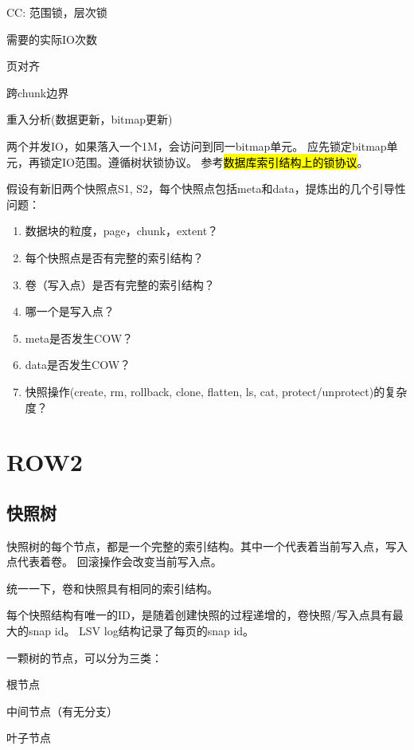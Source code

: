 \begin{itembox}
\item CC: 范围锁，层次锁
\item 需要的实际IO次数
\item 页对齐
\item 跨chunk边界
\item 重入分析(数据更新，bitmap更新)
\end{itembox}

两个并发IO，如果落入一个1M，会访问到同一bitmap单元。
应先锁定bitmap单元，再锁定IO范围。遵循树状锁协议。
参考\hl{数据库索引结构上的锁协议}。

\begin{tcolorbox}

假设有新旧两个快照点S1, S2，每个快照点包括meta和data，提炼出的几个引导性问题：

\begin{enumerate}
    \item 数据块的粒度，page，chunk，extent？
    \item 每个快照点是否有完整的索引结构？
    \item 卷（写入点）是否有完整的索引结构？
    \item 哪一个是写入点？
    \item meta是否发生COW？
    \item data是否发生COW？
    \item 快照操作(create, rm, rollback, clone, flatten, ls, cat, protect/unprotect)的复杂度？
\end{enumerate}

\end{tcolorbox}

\section{ROW2}

\subsection{快照树}

快照树的每个节点，都是一个完整的索引结构。其中一个代表着当前写入点，写入点代表着卷。
回滚操作会改变当前写入点。

统一一下，卷和快照具有相同的索引结构。

每个快照结构有唯一的ID，是随着创建快照的过程递增的，卷快照/写入点具有最大的snap id。
LSV log结构记录了每页的snap id。

一颗树的节点，可以分为三类：
\begin{compactenum}
\item 根节点
\item 中间节点（有无分支）
\item 叶子节点
\end{compactenum}


